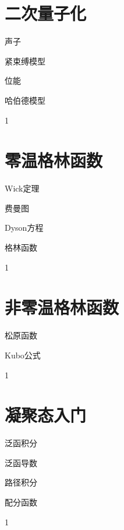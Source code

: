 \documentclass[lang=cn,newtx,10pt,scheme=chinese,thmcnt=section]{elegantbook}
\begin{document}
\chapter{二次量子化}
\begin{introduction}
	\item 声子
	\item 紧束缚模型
	\item 位能
	\item 哈伯德模型
\end{introduction}
1

\chapter{零温格林函数}
\begin{introduction}
	\item Wick定理
	\item 费曼图
	\item Dyson方程
	\item 格林函数
\end{introduction}
1

\chapter{非零温格林函数}
\begin{introduction}
	\item 松原函数
	\item Kubo公式
\end{introduction}
1

\chapter{凝聚态入门}
\begin{introduction}
	\item 泛函积分
	\item 泛函导数
	\item 路径积分
	\item 配分函数
\end{introduction}
1
\end{document}
